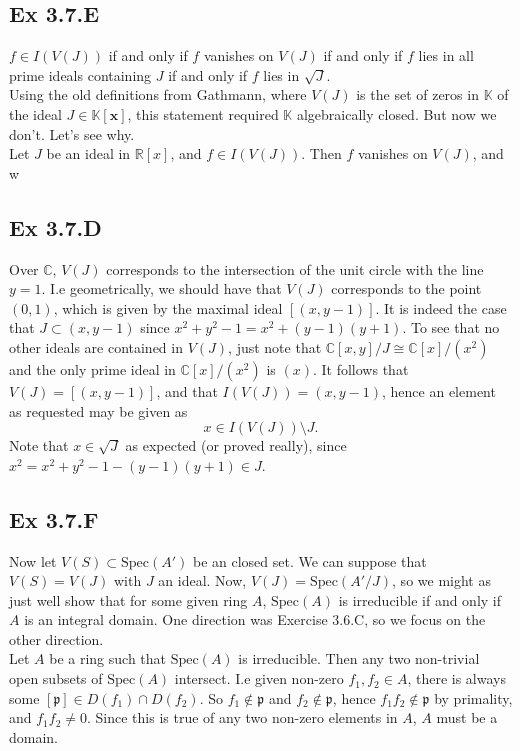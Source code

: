 \documentclass{article}
\theoremstyle{definition}
\newcommand{\R}{\mathbb{R}}
\newcommand{\C}{\mathbb{C}}
\newcommand{\K}{\mathbb{K}}
\newcommand{\Kx}{\K[\bm{x}]}
\newcommand{\Spec}{\text{Spec}}
\begin{document}
\subsection*{Ex 3.7.E}

$f \in I(V(J))$ if and only if $f$ vanishes on $V(J)$ if and only if $f$ lies
in all prime ideals containing $J$ if and only if $f$ lies in $\sqrt{J}$. \\

Using the old definitions from Gathmann, where $V(J)$ is the set of zeros in
$\K$ of the ideal $J \in \Kx$, this statement required $\K$ algebraically
closed. But now we don't. Let's see why. \\

Let $J$ be an ideal in $\R[x]$, and $f \in I(V(J))$. Then $f$ vanishes on $V(J)$,
and w

\subsection*{Ex 3.7.D}

Over $\C$, $V(J)$ corresponds to the intersection of the unit circle with the
line $y = 1$. I.e geometrically, we should have that $V(J)$ corresponds to the
point $(0, 1)$, which is given by the maximal ideal $[(x, y - 1)]$. It is
indeed the case that $J \subset (x, y - 1)$ since $x^2 + y^2 - 1 = x^2 + (y -
1)(y + 1)$. To see that no other ideals are contained in $V(J)$, just note that 
$\C[x, y]/J \cong \C[x]/(x^2)$ and the only prime ideal in $\C[x]/(x^2)$ is $(x)$.
It follows that $V(J) = [(x, y - 1)]$, and that $I(V(J)) = (x, y - 1)$, hence 
an element as requested may be given as 
\[
	x \in I(V(J)) \setminus J.
\] 
Note that $x \in \sqrt{J}$ as expected (or proved really), since $x^2 = x^2 +
y^2 - 1 - (y-1)(y+1) \in J$.

\subsection*{Ex 3.7.F}

Now let $V(S) \subset \Spec(A')$ be an closed set. We can suppose that $V(S) =
V(J)$ with $J$ an ideal. Now, $V(J) = \Spec(A'/J)$, so we might as just well
show that for some given ring $A$, $\Spec(A)$ is irreducible if and only if $A$
is an integral domain. One direction was Exercise 3.6.C, so we focus on the
other direction. \\

Let $A$ be a ring such that $\Spec(A)$ is irreducible. Then any two non-trivial
open subsets of $\Spec(A)$ intersect. I.e given non-zero $f_1, f_2 \in A$,
there is always some $[\mathfrak{p}] \in D(f_1) \cap D(f_2)$. So $f_1 \not \in
\mathfrak{p}$ and $f_2 \not \in \mathfrak{p}$, hence $f_1f_2 \not \in
\mathfrak{p}$ by primality, and $f_1f_2 \not = 0$. Since this is true of any
two non-zero elements in $A$, $A$ must be a domain.
\end{document}
